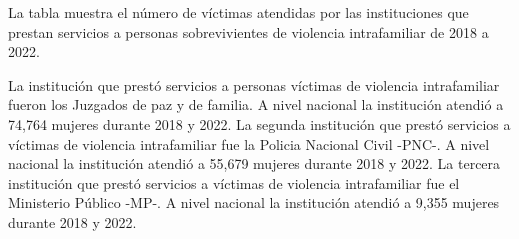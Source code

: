 La tabla muestra el número de víctimas atendidas por las instituciones que prestan servicios a personas sobrevivientes de violencia intrafamiliar de 2018 a 2022. 

La institución que prestó servicios a personas víctimas de violencia intrafamiliar fueron los Juzgados de paz y de familia. A nivel nacional la institución atendió a 74,764 mujeres durante 2018 y 2022. La segunda institución que prestó servicios a víctimas de violencia intrafamiliar fue la Policia Nacional Civil -PNC-. A nivel nacional la institución atendió a 55,679 mujeres durante 2018 y 2022. La tercera institución que prestó servicios a víctimas de violencia intrafamiliar fue el Ministerio Público -MP-. A nivel nacional la institución atendió a 9,355 mujeres durante 2018 y 2022.